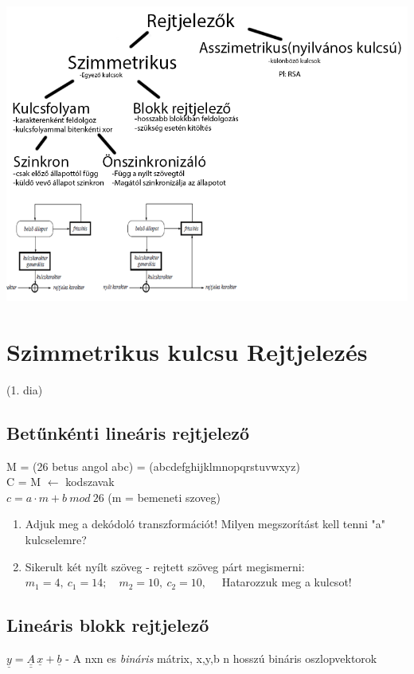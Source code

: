 \includegraphics[scale=0.85]{img/Typessmall}

\section{Szimmetrikus kulcsu Rejtjelezés}
(1. dia)
\subsection{Betűnkénti lineáris rejtjelező}
	M = (26 betus angol abc) = (abcdefghijklmnopqrstuvwxyz)\\[2pt]
	C = M $\leftarrow$ kodszavak\\[2pt]
	$c = a \cdot m + b \ mod \ 26 $ \small(m = bemeneti szoveg) \normalsize
	\begin{enumerate}
		\item Adjuk meg a dekódoló transzformációt! Milyen megszorítást kell tenni "a" kulcselemre?
		\item Sikerult két nyílt szöveg - rejtett szöveg párt megismerni:\\[2pt] $m_1 = 4,\ c_1 = 14; \quad m_2 = 10,\ c_2 = 10, \quad $ Hatarozzuk meg a kulcsot!
	\end{enumerate}

\subsection{Lineáris blokk rejtjelező}

	$\underline{y} = \underline{\underline{A}}\, \underline{x}+\underline{b}$ \quad - A nxn es \textit{bináris} mátrix, x,y,b n hosszú bináris oszlopvektorok

